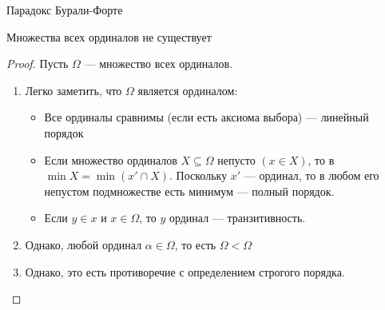 \documentclass[aspectratio=169,dvipsnames,usenames]{beamer}
\begin{document}
\begin{frame}{Парадокс Бурали-Форте}

\begin{thm}Множества всех ординалов не существует\end{thm}
\begin{proof} %
Пусть $\Omega$ --- множество всех ординалов. 
\begin{enumerate}
\item Легко заметить, что $\Omega$ является ординалом:
\begin{itemize}
\item Все ординалы сравнимы (если есть аксиома выбора) --- линейный порядок
\item Если множество ординалов $X \subseteq \Omega$ непусто $(x \in X)$, то в $\min X = \min (x' \cap X)$.
Поскольку $x'$ --- ординал, то в любом его непустом подмножестве есть минимум --- полный порядок.
\item Если $y \in x$ и $x \in \Omega$, то $y$ ординал --- транзитивность.
\end{itemize}
\item Однако, любой ординал $\alpha \in \Omega$, то есть $\Omega < \Omega$
\item Однако, это есть противоречие с определением строгого порядка.
\end{enumerate}
\end{proof}
\end{frame}
\end{document}

